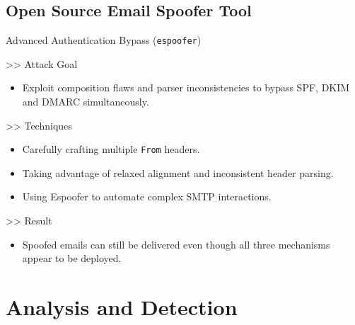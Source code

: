 \documentclass[aspectratio=169,10pt]{beamer}
\begin{document}
\subsection{Open Source Email Spoofer Tool}
\begin{frame}{Advanced Authentication Bypass (\texttt{espoofer})}
  \transdissolve
  \begin{block}{>> Attack Goal}
  \begin{itemize}
    \item Exploit composition flaws and parser inconsistencies to bypass SPF, DKIM and DMARC simultaneously.
  \end{itemize}
  \end{block}
  \vfill
  \begin{block}{>> Techniques}
  \begin{itemize}
    \item Carefully crafting multiple \texttt{From} headers.
    \item Taking advantage of relaxed alignment and inconsistent header parsing.
    \item Using Espoofer to automate complex SMTP interactions.
  \end{itemize}
  \end{block}

  \vfill
  \begin{block}{>> Result}
  \begin{itemize}
    \item Spoofed emails can still be delivered even though all three mechanisms appear to be deployed.
  \end{itemize}
  \end{block}
\end{frame}

\section{Analysis and Detection}
\end{document}
